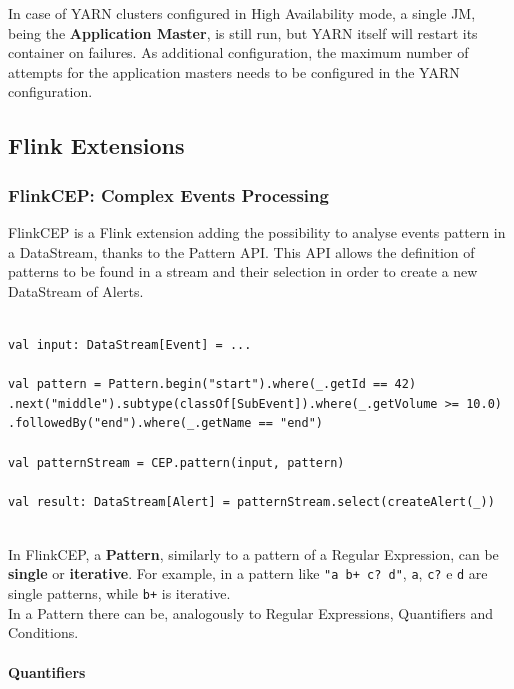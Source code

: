 In case of YARN clusters configured in High Availability mode, a single JM, being the \textbf{Application Master}, is still run, but YARN itself will restart its container on failures. As additional configuration, the maximum number of attempts for the application masters needs to be configured in the YARN configuration.

\subsection{Flink Extensions} \label{FlinkLibs}

\subsubsection{FlinkCEP: Complex Events Processing}

FlinkCEP is a Flink extension adding the possibility to analyse events pattern in a DataStream, thanks to the Pattern API. This API allows the definition of patterns to be found in a stream and their selection in order to create a new DataStream of Alerts.\\


\begin{code}
\label{code:pattern-example}
\begin{verbatim}

val input: DataStream[Event] = ...

val pattern = Pattern.begin("start").where(_.getId == 42)
.next("middle").subtype(classOf[SubEvent]).where(_.getVolume >= 10.0)
.followedBy("end").where(_.getName == "end")

val patternStream = CEP.pattern(input, pattern)

val result: DataStream[Alert] = patternStream.select(createAlert(_))
\end{verbatim}
\end{code}~\\

In FlinkCEP, a \textbf{Pattern}, similarly to a pattern of a Regular Expression, can be \textbf{single} or \textbf{iterative}. For example, in a pattern like \texttt{"a b+ c? d"}, \texttt{a}, \texttt{c?} e \texttt{d} are single patterns, while \texttt{b+} is iterative.
\\

In a Pattern there can be, analogously to Regular Expressions, Quantifiers and Conditions.

\paragraph{Quantifiers}

